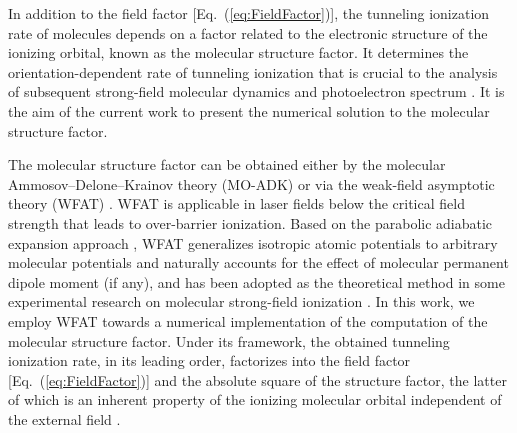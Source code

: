 \documentclass[preprint,12pt]{elsarticle} %
\begin{document}
In addition to the field factor [Eq.~(\ref{eq:FieldFactor})], the tunneling ionization rate of molecules depends on a factor related to the electronic structure of the ionizing orbital, known as the molecular structure factor. It determines the orientation-dependent rate of tunneling ionization that is crucial to the analysis of subsequent strong-field molecular dynamics and photoelectron spectrum \cite{pavicic_direct_2007}. It is the aim of the current work to present the numerical solution to the molecular structure factor.

The molecular structure factor can be obtained either by the molecular Ammosov--Delone--Krainov theory (MO-ADK) \cite{tong_theory_2002, pavicic_direct_2007, holmegaard_photoelectron_2010, johansen_alignment-dependent_2016, zhao_accurate_2017} or via the weak-field asymptotic theory (WFAT) \cite{tolstikhin_theory_2011, madsen_application_2012, madsen_structure_2013, trinh_first-order_2013, madsen_application_2014, tolstikhin_weak-field_2014, tolstikhina_application_2014, saito_structure_2015, trinh_weak-field_2015, dnestryan_integral-equation_2016, svensmark_theory_2016, trinh_first-order_2016, madsen_structure_2017, dnestryan_structure_2018, samygin_weak-field_2018, matsui_weak-field_2021}. WFAT is applicable in laser fields below the critical field strength that leads to over-barrier ionization. Based on the parabolic adiabatic expansion approach \cite{batishchev_atomic_2010}, WFAT generalizes isotropic atomic potentials to arbitrary molecular potentials and naturally accounts for the effect of molecular permanent dipole moment (if any), and has been adopted as the theoretical method in some experimental research on molecular strong-field ionization \cite{ohmura_molecular_2014, kraus_observation_2015, walt_role_2015, endo_imaging_2016, fujise_helicity-dependent_2022}. In this work, we employ WFAT towards a numerical implementation of the computation of the molecular structure factor. Under its framework, the obtained tunneling ionization rate, in its leading order, factorizes into the field factor [Eq.~(\ref{eq:FieldFactor})] and the absolute square of the structure factor, the latter of which is an inherent property of the ionizing molecular orbital independent of the external field \cite{trinh_first-order_2013}.
\end{document}
